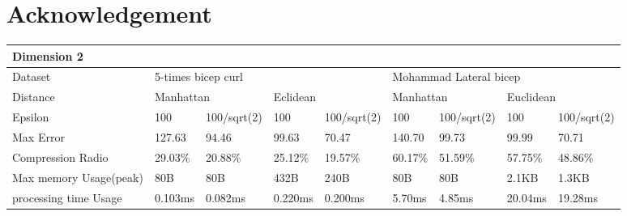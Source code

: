 \documentclass[10pt, conference, compsocconf]{IEEEtran}
\begin{document}
\section*{Acknowledgement}
\begin{table}[]
    \begin{tabular}{|l|l|l|l|l|l|l|l|l|}
    \hline
    \multicolumn{9}{|l|}{Dimension 2}                                                                                                                         \\ \hline
    Dataset                & \multicolumn{4}{l|}{5-times bicep curl}                        & \multicolumn{4}{l|}{Mohammad Lateral bicep}                     \\ \hline
    Distance               & \multicolumn{2}{l|}{Manhattan} & \multicolumn{2}{l|}{Eclidean} & \multicolumn{2}{l|}{Manhattan} & \multicolumn{2}{l|}{Euclidean} \\ \hline
    Epsilon                & 100          & 100/sqrt(2)     & 100         & 100/sqrt(2)     & 100        & 100/sqrt(2)       & 100        & 100/sqrt(2)       \\ \hline
    Max Error              & 127.63       & 94.46           & 99.63       & 70.47           & 140.70     & 99.73             & 99.99      & 70.71             \\ \hline
    Compression Radio      & 29.03\%      & 20.88\%         & 25.12\%     & 19.57\%         & 60.17\%    & 51.59\%           & 57.75\%    & 48.86\%           \\ \hline
    Max memory Usage(peak) & 80B          & 80B             & 432B        & 240B            & 80B        & 80B               & 2.1KB      & 1.3KB             \\ \hline
    processing time Usage  & 0.103ms      & 0.082ms         & 0.220ms     & 0.200ms         & 5.70ms     & 4.85ms            & 20.04ms    & 19.28ms           \\ \hline
    \end{tabular}
\end{table}
\end{document}
